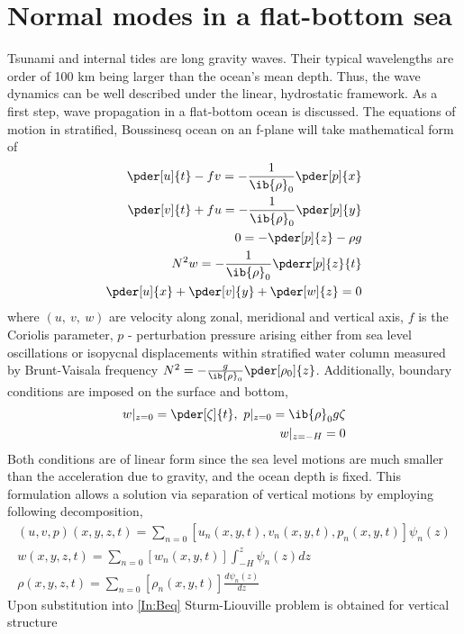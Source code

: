 \documentclass[12pt]{article}
\begin{document}
\section{Normal modes in a flat-bottom sea}
Tsunami and internal tides are long gravity waves. Their typical wavelengths are order of 
100 km being larger than the ocean's mean depth. Thus, the wave dynamics can be well described 
under the linear, hydrostatic framework. As a first step, wave propagation in a flat-bottom ocean 
is discussed. The equations of motion in stratified, Boussinesq ocean on an f-plane 
\citep{kundu2008fluid, cushman2011introduction} will take mathematical form of
\begin{subequations}
	\label{In:Beq}
	\begin{align}
	\pder[u]{t} - f v = -\frac{1}{\ib{\rho}_0}\pder[p]{x}\\
	\pder[v]{t} + f u = -\frac{1}{\ib{\rho}_0}\pder[p]{y}\\
	0 = -\pder[p]{z} - \rho g\\
	N^2 w = -\frac{1}{\ib{\rho}_0} \pderr[p]{z}{t}\\
	\pder[u]{x} + \pder[v]{y} + \pder[w]{z} = 0
	\end{align}
\end{subequations}
where $(u,~v,~w)$ are velocity along zonal, meridional and vertical axis, $f$ is the Coriolis 
parameter, $p$ - perturbation pressure arising either from sea level oscillations or isopycnal 
displacements within stratified water column measured by Brunt-Vaisala frequency $N^2 = 
-\frac{g}{\ib{\rho}_0}\pder[\rho_0]{z}$. Additionally, boundary conditions are imposed on the 
surface and bottom,
\begin{align}
w|_{z = 0} = \pder[\zeta]{t},~p|_{z = 0} = \ib{\rho}_0 g \zeta\\
w|_{z = -H} = 0\label{In:bc.swe}
\end{align}
Both conditions are of linear form since the sea level motions are much smaller than the 
acceleration due to gravity, and the ocean depth is fixed. This formulation allows a solution via 
separation of vertical motions by employing following decomposition,
\begin{align}
(u, v, p)(x,y,z,t) = \sum_{n = 0} [u_n(x,y,t), v_n(x,y,t), p_n(x,y,t)]\psi_n(z)\\
w(x,y,z,t) = \sum_{n = 0} [w_n(x,y,t)] \int_{-H}^z \psi_n(z) dz\\
\rho(x,y,z,t) = \sum_{n = 0} [\rho_n(x,y,t)] \frac{d \psi_n(z)}{dz}
\end{align}
Upon substitution into \eqref{In:Beq} Sturm-Liouville problem is obtained for vertical structure 
\end{document}
